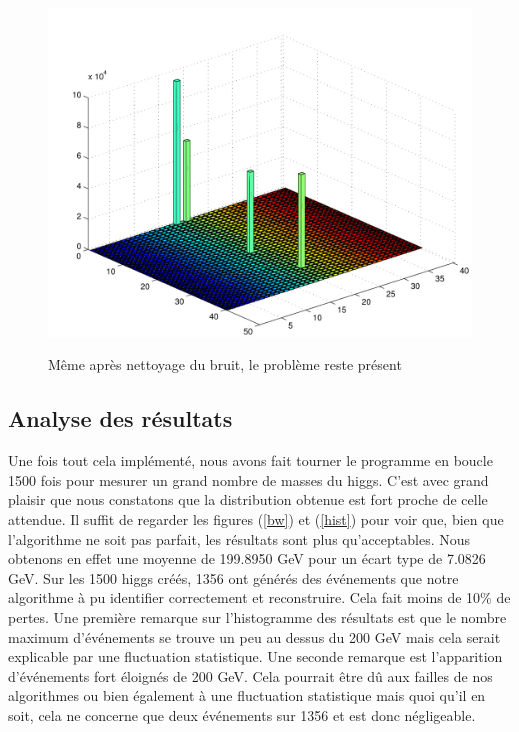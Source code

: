\documentclass[11pt]{article}
\begin{document}
\begin{figure}
\caption{Même après nettoyage du bruit, le problème reste présent}
\includegraphics[scale=0.55]{images/mauvaisCasNet-eps-converted-to.pdf}
\label{pasbonp}
\end{figure}

\newpage
\subsection{Analyse des résultats}

Une fois tout cela implémenté, nous avons fait tourner le programme en boucle
1500 fois pour mesurer un grand nombre de masses du higgs. C'est avec grand
plaisir que nous constatons que la distribution obtenue est fort proche de celle
attendue. Il suffit de regarder les figures (\ref{bw}) et (\ref{hist}) pour voir
que, bien que l'algorithme ne soit pas parfait, les résultats sont plus
qu'acceptables. Nous obtenons en effet une moyenne de 199.8950 GeV pour un
écart type de 7.0826 GeV. Sur les 1500 higgs créés, 1356 ont générés des
événements que notre algorithme à pu identifier correctement et reconstruire.
Cela fait moins de 10\% de pertes. Une première remarque sur l'histogramme des
résultats est que le nombre maximum d'événements se trouve un peu au dessus du
200 GeV mais cela serait explicable par une fluctuation statistique. Une seconde
remarque est l'apparition d'événements fort éloignés de 200 GeV. Cela pourrait
être dû aux failles de nos algorithmes ou bien également à une fluctuation
statistique mais quoi qu'il en soit, cela ne concerne que deux événements
sur 1356 et est donc négligeable.
\end{document}
